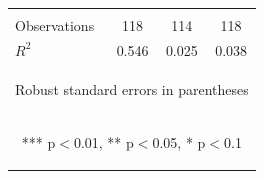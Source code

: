 \begin{center}
\begin{tabular}{lccc}
\vspace{4pt} & \begin{footnotesize}\end{footnotesize} & \begin{footnotesize}\end{footnotesize} & \begin{footnotesize}\end{footnotesize} \\
Observations & 118 & 114 & 118 \\
 $R^2$ & 0.546 & 0.025 & 0.038 \\ \hline
\multicolumn{4}{c}{\begin{footnotesize} Robust standard errors in parentheses\end{footnotesize}} \\
\multicolumn{4}{c}{\begin{footnotesize} *** p$<$0.01, ** p$<$0.05, * p$<$0.1\end{footnotesize}} \\
\end{tabular}
\end{center}
